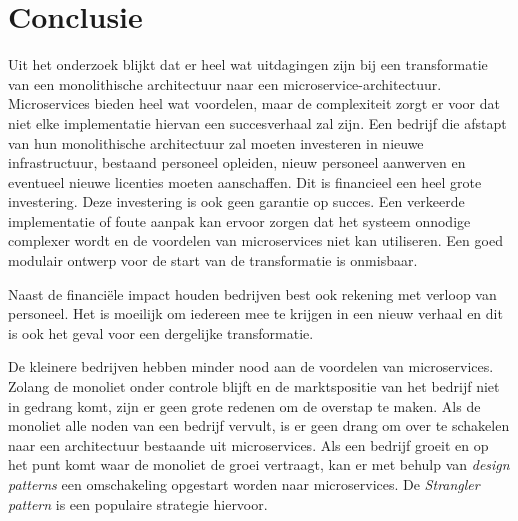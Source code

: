 
\chapter{Conclusie}
\label{ch:conclusie}


Uit het onderzoek blijkt dat er heel wat uitdagingen zijn bij een transformatie van een monolithische architectuur naar een microservice-architectuur. Microservices bieden heel wat voordelen, maar de complexiteit zorgt er voor dat niet elke implementatie hiervan een succesverhaal zal zijn. Een bedrijf die afstapt van hun monolithische architectuur zal moeten investeren in nieuwe infrastructuur, bestaand personeel opleiden, nieuw personeel aanwerven en eventueel nieuwe licenties moeten aanschaffen. Dit is financieel een heel grote investering. Deze investering is ook geen garantie op succes. Een verkeerde implementatie of foute aanpak kan ervoor zorgen dat het systeem onnodige complexer wordt en de voordelen van microservices niet kan utiliseren. Een goed modulair ontwerp voor de start van de transformatie is onmisbaar. 

Naast de financiële impact houden bedrijven best ook rekening met verloop van personeel. Het is moeilijk om iedereen mee te krijgen in een nieuw verhaal en dit is ook het geval voor een dergelijke transformatie.

De kleinere bedrijven hebben minder nood aan de voordelen van microservices. Zolang de monoliet onder controle blijft en de marktspositie van het bedrijf niet in gedrang komt, zijn er geen grote redenen om de overstap te maken. Als de monoliet alle noden van een bedrijf vervult, is er geen drang om over te schakelen naar een architectuur bestaande uit microservices. Als een bedrijf groeit en op het punt komt waar de monoliet de groei vertraagt, kan er met behulp van \emph{design patterns} een omschakeling opgestart worden naar microservices. De \emph{Strangler pattern} is een populaire strategie hiervoor.


